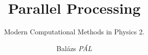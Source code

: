 \title[Parallel Processing]{Parallel Processing}

\subtitle{Modern Computational Methods in Physics 2.}

\author[Balázs \textit{PÁL}]{Balázs \textit{PÁL}}


\date[ELTE Physics BSc]{}

